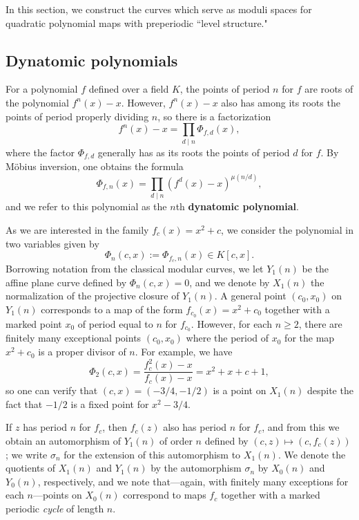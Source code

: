 \documentclass[12pt]{amsart}
\theoremstyle{definition}
\numberwithin{equation}{section}
\begin{document}
In this section, we construct the curves which serve as moduli spaces for quadratic polynomial maps with preperiodic ``level structure."

\subsection{Dynatomic polynomials}\label{sec:dyn-poly}

For a polynomial $f$ defined over a field $K$, the points of period $n$ for $f$ are roots of the polynomial $f^n(x) - x$. However, $f^n(x) - x$ also has among its roots the points of period properly dividing $n$, so there is a factorization
    \[
        f^n(x) - x = \prod_{d\mid n} \Phi_{f,d}(x),
    \]
where the factor $\Phi_{f,d}$ generally has as its roots the points of period $d$ for $f$. By M\"obius inversion, one obtains the formula
    \[
        \Phi_{f,n}(x) = \prod_{d\mid n} (f^d(x) - x)^{\mu(n/d)},
    \]
and we refer to this polynomial as the $n$th {\bf dynatomic polynomial}.

As we are interested in the family $f_c(x) = x^2 + c$, we consider the polynomial in two variables given by
    \[
    \Phi_n(c,x) := \Phi_{f_c,n}(x) \in K[c,x].
    \]
Borrowing notation from the classical modular curves, we let $Y_1(n)$ be the affine plane curve defined by $\Phi_n(c,x) = 0$, and we denote by $X_1(n)$ the normalization of the projective closure of $Y_1(n)$. A general point $(c_0,x_0)$ on $Y_1(n)$ corresponds to a map of the form $f_{c_0}(x) = x^2 + c_0$ together with a marked point $x_0$ of period equal to $n$ for $f_{c_0}$. However, for each $n \ge 2$, there are finitely many exceptional points $(c_0,x_0)$ where the period of $x_0$ for the map $x^2 + c_0$ is a proper divisor of $n$. For example, we have
    \[
    \Phi_2(c,x) = \frac{f_c^2(x) - x}{f_c(x) - x} = x^2 + x + c + 1,
    \]
so one can verify that $(c,x) = (-3/4,-1/2)$ is a point on $X_1(n)$ despite the fact that $-1/2$ is a fixed point for $x^2 - 3/4$.

If $z$ has period $n$ for $f_c$, then $f_c(z)$ also has period $n$ for $f_c$, and from this we obtain an automorphism of $Y_1(n)$ of order $n$ defined by $(c,z) \mapsto (c,f_c(z))$; we write $\sigma_n$ for the extension of this automorphism to $X_1(n)$. We denote the quotients of $X_1(n)$ and $Y_1(n)$ by the automorphism $\sigma_n$ by $X_0(n)$ and $Y_0(n)$, respectively, and we note that---again, with finitely many exceptions for each $n$---points on $X_0(n)$ correspond to maps $f_c$ together with a marked periodic {\it cycle} of length $n$.
\end{document}

